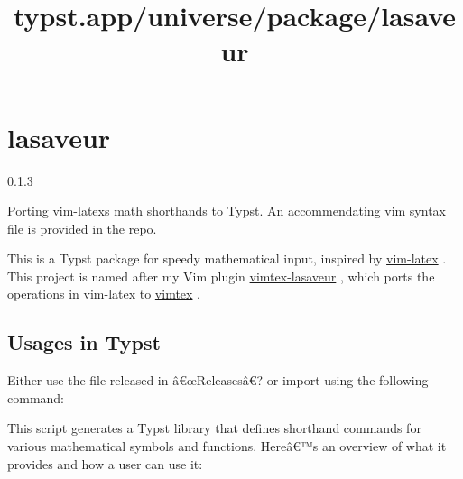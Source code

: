 \title{typst.app/universe/package/lasaveur}

\label{banner}
\section{lasaveur}\label{lasaveur}

{ 0.1.3 }

Porting vim-latex\textquotesingle s math shorthands to Typst. An
accommendating vim syntax file is provided in the repo.

\label{readme}
This is a Typst package for speedy mathematical input, inspired by
\href{https://github.com/vim-latex/vim-latex}{vim-latex} . This project
is named after my Vim plugin
\href{https://github.com/yangwenbo99/vimtex-lasaveur}{vimtex-lasaveur} ,
which ports the operations in vim-latex to
\href{https://github.com/lervag/vimtex}{vimtex} .

\subsection{Usages in Typst}\label{usages-in-typst}

Either use the file released in â€œReleasesâ€? or import using the
following command:

\begin{Shaded}
\begin{Highlighting}[]
\end{Highlighting}
\end{Shaded}

This script generates a Typst library that defines shorthand commands
for various mathematical symbols and functions. Hereâ€™s an overview of
what it provides and how a user can use it:

